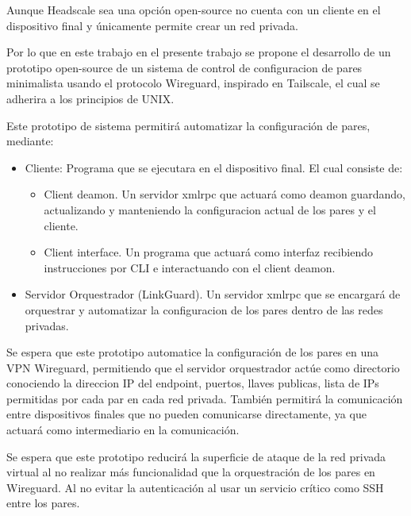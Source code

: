 \documentclass[letterpaper,12pt,oneside]{book}
\begin{document}
Aunque Headscale sea una opción open-source no cuenta con un cliente en el dispositivo final y únicamente permite crear un red privada.

Por lo que en este trabajo en el presente trabajo se propone el desarrollo de un prototipo open-source de un sistema de control de configuracion de pares minimalista usando el protocolo Wireguard, inspirado en Tailscale, el cual se adherira a los principios de UNIX.

Este prototipo de sistema permitirá automatizar la configuración de pares, mediante:
\begin{itemize}
    \item Cliente: Programa que se ejecutara en el dispositivo final. El cual consiste de:
    \begin{itemize}
        \item Client deamon. Un servidor xmlrpc que actuará como deamon guardando, actualizando y manteniendo la configuracion actual de los pares y el cliente.
        \item Client interface. Un programa que actuará como interfaz recibiendo instrucciones por CLI e interactuando con el client deamon.
    \end{itemize}
    \item Servidor Orquestrador (LinkGuard). Un servidor xmlrpc que se encargará de orquestrar y automatizar la configuracion de los pares dentro de las redes privadas.
\end{itemize}

Se espera que este prototipo automatice la configuración de los pares en una VPN Wireguard, permitiendo que el servidor orquestrador actúe como directorio conociendo la direccion IP del endpoint, puertos, llaves publicas, lista de IPs permitidas por cada par en cada red privada. También permitirá la comunicación entre dispositivos finales que no pueden comunicarse directamente, ya que actuará como intermediario en la comunicación.

Se espera que este prototipo reducirá la superficie de ataque de la red privada virtual al no realizar más funcionalidad que la orquestración de los pares en Wireguard. 
Al no evitar la autenticación al usar un servicio crítico como SSH entre los pares.

\end{document}

